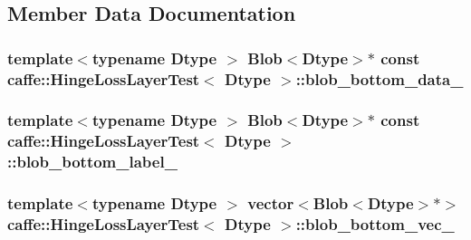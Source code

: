 \subsection{Member Data Documentation}
\hypertarget{classcaffe_1_1_hinge_loss_layer_test_a86c856e37099156adab0197c38ce74ec}{
\subsubsection[{blob\+\_\+bottom\+\_\+data\+\_\+}]{\setlength{\rightskip}{0pt plus 5cm}template$<$typename Dtype $>$ {\bf Blob}$<$Dtype$>$$\ast$ const {\bf caffe\+::\+Hinge\+Loss\+Layer\+Test}$<$ Dtype $>$\+::blob\+\_\+bottom\+\_\+data\+\_\+\hspace{0.3cm}{\ttfamily [protected]}}}\label{classcaffe_1_1_hinge_loss_layer_test_a86c856e37099156adab0197c38ce74ec}
\hypertarget{classcaffe_1_1_hinge_loss_layer_test_a67cfd73cc1d49d8c959d05da2a5e15ef}{
\subsubsection[{blob\+\_\+bottom\+\_\+label\+\_\+}]{\setlength{\rightskip}{0pt plus 5cm}template$<$typename Dtype $>$ {\bf Blob}$<$Dtype$>$$\ast$ const {\bf caffe\+::\+Hinge\+Loss\+Layer\+Test}$<$ Dtype $>$\+::blob\+\_\+bottom\+\_\+label\+\_\+\hspace{0.3cm}{\ttfamily [protected]}}}\label{classcaffe_1_1_hinge_loss_layer_test_a67cfd73cc1d49d8c959d05da2a5e15ef}
\hypertarget{classcaffe_1_1_hinge_loss_layer_test_a9ab9805216e3120f98b6fd151c715ece}{
\subsubsection[{blob\+\_\+bottom\+\_\+vec\+\_\+}]{\setlength{\rightskip}{0pt plus 5cm}template$<$typename Dtype $>$ vector$<${\bf Blob}$<$Dtype$>$$\ast$$>$ {\bf caffe\+::\+Hinge\+Loss\+Layer\+Test}$<$ Dtype $>$\+::blob\+\_\+bottom\+\_\+vec\+\_\+\hspace{0.3cm}{\ttfamily [protected]}}}\label{classcaffe_1_1_hinge_loss_layer_test_a9ab9805216e3120f98b6fd151c715ece}
